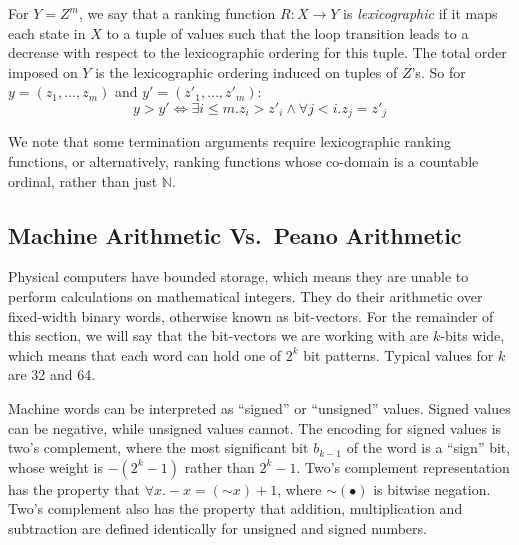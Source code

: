 \documentclass[a4paper]{llncs}
\begin{document}
\begin{definition}
For $Y = Z^m$, we say that a ranking function $R: X \to Y$ is \emph{lexicographic}
if it maps each state in $X$ to a tuple of values such that the loop transition leads to a decrease with
respect to the lexicographic ordering for this tuple.
The total order imposed on $Y$ is the lexicographic ordering
induced on tuples of $Z$'s.  So for $y = (z_1, \ldots, z_m)$ and
$y' = (z'_1, \ldots, z'_m)$:
\[
 y > y' \iff \exists i \leq m . z_i > z'_i \wedge \forall j < i . z_j = z'_j
\]


\end{definition}

We note that some termination arguments require lexicographic ranking functions, or
alternatively, ranking functions whose co-domain is a countable ordinal, rather than just $\mathbb{N}$.




\subsection{Machine Arithmetic Vs.~Peano Arithmetic} \label{sec:machine.arith} 

Physical computers have bounded storage, which means they are unable to
perform calculations on mathematical integers.  %
They do their arithmetic over
fixed-width binary words, otherwise known as bit-vectors.  For the remainder
of this section, we will say that the bit-vectors we are working with are
$k$-bits wide, which means that each word can hold one of $2^k$ bit
patterns.  Typical values for $k$ are 32 and 64.

Machine words can be interpreted as ``signed'' or ``unsigned'' values. 
Signed values can be negative, while unsigned values cannot.  The encoding
for signed values is two's complement, where the most significant bit
$b_{k-1}$ of the word is a ``sign'' bit, whose weight is $-(2^k - 1)$ rather
than $2^k - 1$.  Two's complement representation has the property that
$\forall x .  -x = (\mathord{\sim} x) + 1$, where $\mathord{\sim}(\bullet)$
is bitwise negation.  Two's complement also has the property that addition,
multiplication and subtraction are defined identically for unsigned and
signed numbers.
\end{document}
